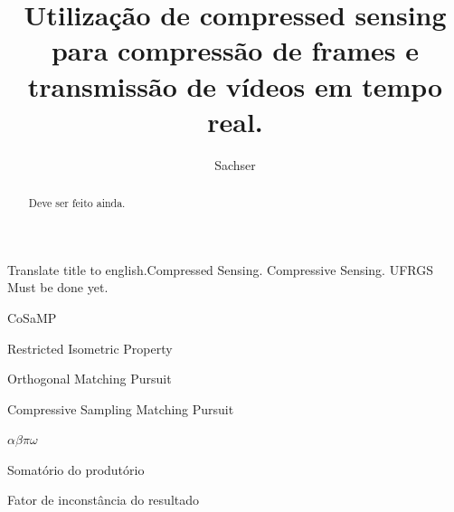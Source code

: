 \documentclass[cic,tc]{iiufrgs}
\title{Utilização de compressed sensing para compressão de frames e transmissão de vídeos em tempo real.}
\author{Sachser}{Eduardo}
\begin{document}
\maketitle





\begin{abstract}
    Deve ser feito ainda.
\end{abstract}

\begin{englishabstract}{Translate title to english.}{Compressed Sensing. Compressive Sensing. UFRGS}
    Must be done yet.
\end{englishabstract}

\listoffigures

\listoftables

\begin{listofabbrv}{CoSaMP}
    \item[RIP] Restricted Isometric Property
    \item[OMP] Orthogonal Matching Pursuit
    \item[CoSaMP] Compressive Sampling Matching Pursuit 
\end{listofabbrv}

\begin{listofsymbols}{$\alpha\beta\pi\omega$}
    \item[$\sum{\frac{a}{b}}$] Somatório do produtório
    \item[$\alpha\beta\pi\omega$] Fator de inconstância do resultado
\end{listofsymbols}
\end{document}

